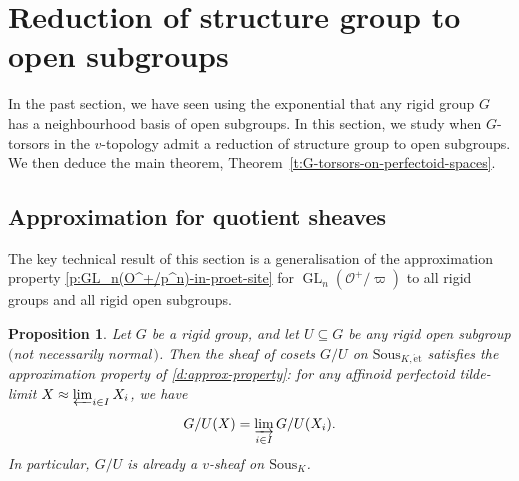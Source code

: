 \documentclass[11pt]{amsart}
\numberwithin{equation}{section}
\newtheorem{Proposition}[thm]{Proposition}
\theoremstyle{definition}
\theoremstyle{remark}
\renewcommand{\O}{\mathcal{O}}
\newcommand{\GL}{\operatorname{GL}}
\newcommand{\et}{{\operatorname{\acute{e}t}}}
\begin{document}
\section{Reduction of structure group to open subgroups}\label{s:quot-sheaves}
In the past section, we have seen using the exponential that any rigid group $G$ has a neighbourhood basis of open subgroups. In this section, we study when $G$-torsors in the $v$-topology admit a reduction of structure group to open subgroups. We then deduce the main theorem, Theorem~\ref{t:G-torsors-on-perfectoid-spaces}.

\subsection{Approximation for quotient sheaves}\label{s:approx-quot-sheaves}
The key technical result of this section is a generalisation of the approximation property \cref{p:GL_n(O^+/p^n)-in-proet-site} for $\GL_n(\O^+/\varpi)$ to all rigid groups and all rigid open subgroups.  

\begin{Proposition}\label{p:approx-property-for-G/U}
	Let $G$ be a rigid group, and let $U\subseteq G$ be any rigid open subgroup $($not necessarily normal\,$)$. Then the sheaf of cosets $G/U$ on $\mathrm{Sous}_{K,\et}$ satisfies the approximation property of \cref{d:approx-property}: for any affinoid perfectoid tilde-limit $X\approx \varprojlim_{i\in I} X_i$, we have
	\[ G/U(X)=\varinjlim_{i\in I} G/U(X_i).\]
	In particular, $G/U$ is already a $v$-sheaf on $\mathrm{Sous}_{K}$. 
\end{Proposition}
\end{document}

